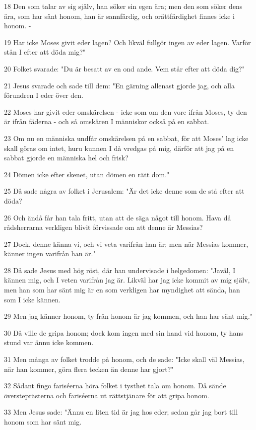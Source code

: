 \par 18 Den som talar av sig själv, han söker sin egen ära; men den som söker dens ära, som har sänt honom, han är sannfärdig, och orättfärdighet finnes icke i honom. -
\par 19 Har icke Moses givit eder lagen? Och likväl fullgör ingen av eder lagen. Varför stån I efter att döda mig?"
\par 20 Folket svarade: "Du är besatt av en ond ande. Vem står efter att döda dig?"
\par 21 Jesus svarade och sade till dem: "En gärning allenast gjorde jag, och alla förundren I eder över den.
\par 22 Moses har givit eder omskärelsen - icke som om den vore ifrån Moses, ty den är ifrån fäderna - och så omskären I människor också på en sabbat.
\par 23 Om nu en människa undfår omskärelsen på en sabbat, för att Moses' lag icke skall göras om intet, huru kunnen I då vredgas på mig, därför att jag på en sabbat gjorde en människa hel och frisk?
\par 24 Dömen icke efter skenet, utan dömen en rätt dom."
\par 25 Då sade några av folket i Jerusalem: "Är det icke denne som de stå efter att döda?
\par 26 Och ändå får han tala fritt, utan att de säga något till honom. Hava då rådsherrarna verkligen blivit förvissade om att denne är Messias?
\par 27 Dock, denne känna vi, och vi veta varifrån han är; men när Messias kommer, känner ingen varifrån han är."
\par 28 Då sade Jesus med hög röst, där han undervisade i helgedomen: "Javäl, I kännen mig, och I veten varifrån jag är. Likväl har jag icke kommit av mig själv, men han som har sänt mig är en som verkligen har myndighet att sända, han som I icke kännen.
\par 29 Men jag känner honom, ty från honom är jag kommen, och han har sänt mig."
\par 30 Då ville de gripa honom; dock kom ingen med sin hand vid honom, ty hans stund var ännu icke kommen.
\par 31 Men många av folket trodde på honom, och de sade: "Icke skall väl Messias, när han kommer, göra flera tecken än denne har gjort?"
\par 32 Sådant fingo fariséerna höra folket i tysthet tala om honom. Då sände översteprästerna och fariséerna ut rättstjänare för att gripa honom.
\par 33 Men Jesus sade: "Ännu en liten tid är jag hos eder; sedan går jag bort till honom som har sänt mig.
